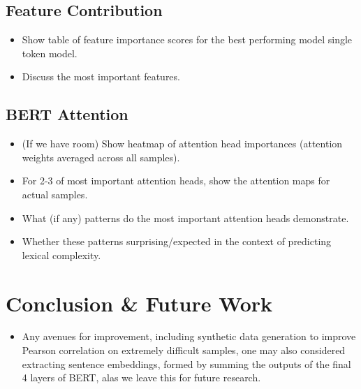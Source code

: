 \documentclass[11pt,a4paper]{article}
\begin{document}
\subsection{Feature Contribution}

\begin{itemize}
  \item Show table of feature importance scores for the best performing model single token model.
  \item Discuss the most important features.
\end{itemize}

\subsection{BERT Attention}

\begin{itemize}
  \item (If we have room) Show heatmap of attention head importances (attention weights averaged across all samples).
  \item For 2-3 of most important attention heads, show the attention maps for actual samples.
  \item What (if any) patterns do the most important attention heads demonstrate.
  \item Whether these patterns surprising/expected in the context of predicting lexical complexity.
\end{itemize}

\section{Conclusion \& Future Work}
\begin{itemize}
  \item Any avenues for improvement, including synthetic data generation to improve Pearson correlation on extremely difficult samples, one may also considered extracting sentence embeddings, formed by summing the outputs of the final 4 layers of BERT, alas we leave this for future research.
\end{itemize}




\end{document}
